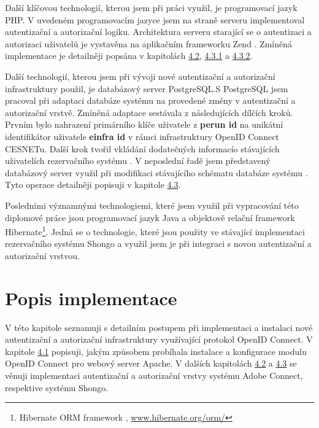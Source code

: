 \documentclass[
  printed, %
  twoside, %
  table,   %
  nolof,     %
  nolot,     %
]{fithesis3}
\begin{document}
\par
Další klíčovou technologií, kterou jsem při práci využil, je programovací jazyk PHP. V uvedeném programovacím jazyce jsem na straně serveru  implementoval autentizační a autorizační logiku. Architektura serveru  starající se o autentizaci a autorizaci uživatelů je vystavěna na aplikačním frameworku Zend \cite{zend}. Zmíněná implementace je detailněji popsána v kapitolách \hyperref[ACImpl]{4.2}, \hyperref[ShongoImpl-authn]{4.3.1} a \hyperref[ShongoImpl-authr]{4.3.2}. 

\par

Další technologií, kterou jsem při vývoji nové autentizační a autorizační infrastruktury použil, je databázový server PostgreSQL.\break S PostgreSQL jsem pracoval při adaptaci databáze systému  na provedené změny v autentizační a autorizační vrstvě. Zmíněná adaptace sestávala z následujících dílčích kroků. Prvním bylo nahrazení primárního klíče uživatele z \textbf{perun id} na unikátní identifikátor uživatele  \textbf{einfra id} v rámci infrastruktury OpenID Connect CESNETu. Další krok tvořil vkládání dodatečných informací\break o stávajících uživatelích rezervačního systému . V neposlední řadě jsem představený databázový server využil při modifikaci stávajícího schématu databáze systému . Tyto operace detailněji popisuji v kapitole \hyperref[ShongoImpl]{4.3}. 
\par 
Posledními významnými technologiemi, které jsem využil při vypracování této diplomové práce jsou programovací jazyk Java a objektově relační framework Hibernate\footnote{Hibernate ORM framework , \url{www.hibernate.org/orm/}}. Jedná se o technologie, které jsou použity ve stávající implementaci rezervačního systému Shongo a využil jsem je při integraci s novou autentizační a autorizační vrstvou.  


\chapter{Popis implementace}
V této kapitole seznamuji s detailním postupem při implementaci a instalaci nové autentizační a autorizační infrastruktury využívající protokol OpenID Connect. V kapitole \hyperref[apacheConfig]{4.1} popisuji, jakým způsobem probíhala instalace a konfigurace modulu OpenID Connect pro webový server Apache. V dalších kapitolách \hyperref[ACImpl]{4.2} a \hyperref[ShongoImpl]{4.3} se věnuji implementaci autentizační a autorizační vrstvy systému Adobe Connect, respektive systému Shongo.   
\end{document}

